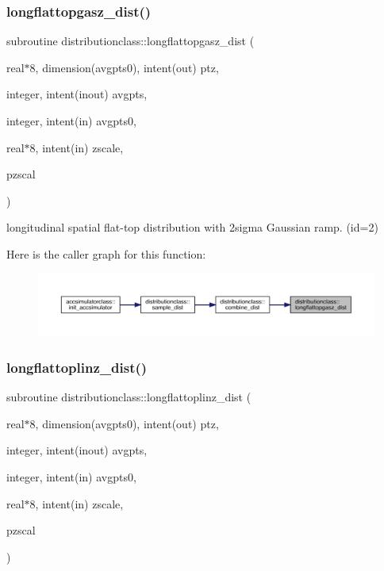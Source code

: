 \subsubsection{\texorpdfstring{longflattopgasz\_dist()}{longflattopgasz\_dist()}}
{\footnotesize\ttfamily subroutine distributionclass\+::longflattopgasz\+\_\+dist (\begin{DoxyParamCaption}\item[{real$\ast$8, dimension(avgpts0), intent(out)}]{ptz,  }\item[{integer, intent(inout)}]{avgpts,  }\item[{integer, intent(in)}]{avgpts0,  }\item[{real$\ast$8, intent(in)}]{zscale,  }\item[{}]{pzscal }\end{DoxyParamCaption})}



longitudinal spatial flat-\/top distribution with 2sigma Gaussian ramp. (id=2) 

Here is the caller graph for this function\+:\nopagebreak
\begin{figure}[H]
\begin{center}
\leavevmode
\includegraphics[width=350pt]{namespacedistributionclass_a635c045c52b04bd03c076b8b8454b278_icgraph}
\end{center}
\end{figure}
\mbox{\label{namespacedistributionclass_a00926191e33371dc32c2fdbaca1ee2a5}} 
\subsubsection{\texorpdfstring{longflattoplinz\_dist()}{longflattoplinz\_dist()}}
{\footnotesize\ttfamily subroutine distributionclass\+::longflattoplinz\+\_\+dist (\begin{DoxyParamCaption}\item[{real$\ast$8, dimension(avgpts0), intent(out)}]{ptz,  }\item[{integer, intent(inout)}]{avgpts,  }\item[{integer, intent(in)}]{avgpts0,  }\item[{real$\ast$8, intent(in)}]{zscale,  }\item[{}]{pzscal }\end{DoxyParamCaption})}



